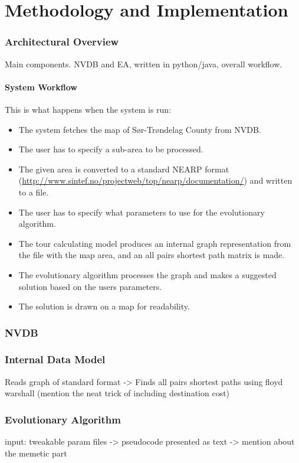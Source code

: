 \chapter{Methodology and Implementation}

\subsection{Architectural Overview}
Main components. NVDB and EA, written in python/java, overall workflow.

\subsubsection{System Workflow}
This is what happens when the system is run:

\begin{itemize}
	\item The system fetches the map of Sør-Trøndelag County from NVDB.
	\item The user has to specify a sub-area to be processed.
	\item The given area is converted to a standard NEARP format (\url{http://www.sintef.no/projectweb/top/nearp/documentation/}) and written to a file.
	\item The user has to specify what parameters to use for the evolutionary algorithm.
	\item The tour calculating model produces an internal graph representation from the file with the map area, and an all pairs shortest path matrix is made.
	\item The evolutionary algorithm processes the graph and makes a suggested solution based on the users parameters.
	\item The solution is drawn on a map for readability.
\end{itemize}

\subsection{NVDB}

\subsection{Internal Data Model}
Reads graph of standard format -> Finds all pairs shortest paths using floyd warshall (mention the neat trick of including destination cost)

\subsection{Evolutionary Algorithm}
input: tweakable param files -> pseudocode presented as text -> mention about the memetic part

